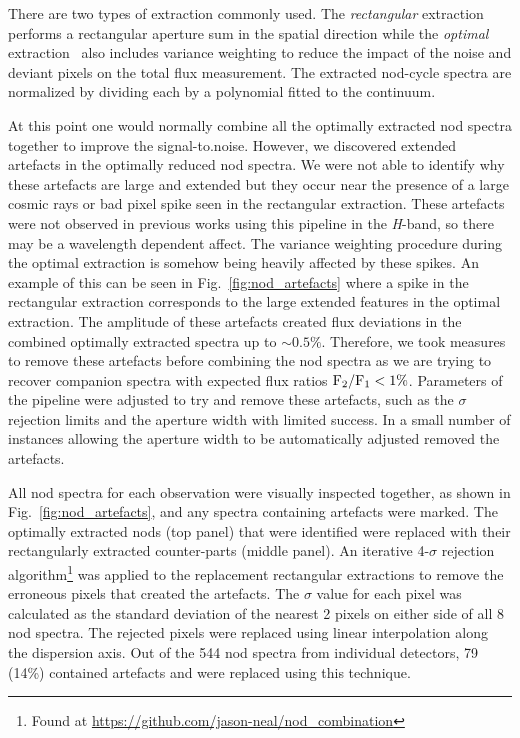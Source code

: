 \documentclass[fleqn,usenatbib]{mnras}
\newcommand*\rd{\color{red}}
\begin{document}
There are two types of extraction commonly used. The \emph{rectangular} extraction performs a rectangular aperture sum in the spatial direction while the \emph{optimal} extraction~\citep{horne_optimal_1986} also includes variance weighting to reduce the impact of the noise and deviant pixels on the total flux measurement. The extracted nod-cycle spectra are normalized by dividing each by a polynomial fitted to the continuum.

At this point one would normally combine all the optimally extracted nod spectra together to improve the signal-to.noise. {\rd However, we discovered extended artefacts in the optimally reduced nod spectra. We were not able to identify why these artefacts are large and extended but they occur near the presence of a large cosmic rays or bad pixel spike seen in the rectangular extraction. These artefacts were not observed in previous works using this pipeline in the \textit{H}-band, so there may be a wavelength dependent affect. The variance weighting procedure during the optimal extraction is somehow being heavily affected by these spikes.} An example of this can be seen in Fig.~\ref{fig:nod_artefacts} where a spike in the rectangular extraction corresponds to the large extended features in the optimal extraction. The amplitude of these artefacts created flux deviations in the combined optimally extracted spectra up to \(\sim 0.5\% \). 
Therefore, we took measures to remove these artefacts before combining the nod spectra as we are trying to recover companion spectra with expected flux ratios \(\rm {F_2}/{F_1} < 1\% \). {\rd Parameters of the pipeline were adjusted to try and remove these artefacts, such as the $\sigma$ rejection limits and the aperture width with limited success. In a small number of instances allowing the aperture width to be automatically adjusted removed the artefacts.} 

All nod spectra for each observation were visually inspected together, as shown in  Fig.~\ref{fig:nod_artefacts}, and any spectra containing artefacts were marked. The optimally extracted nods (top panel)  that were identified were replaced with their rectangularly extracted counter-parts (middle panel). An iterative 4-\(\sigma \) rejection algorithm\footnote{Found at \url{https://github.com/jason-neal/nod_combination}} was applied to the replacement rectangular extractions to remove the erroneous pixels that created the artefacts. The \(\sigma\) value for each pixel was calculated as the standard deviation of the nearest 2 pixels on either side of all 8 nod spectra. The rejected pixels were replaced using linear interpolation along the dispersion axis. {\rd Out of the 544 nod spectra from individual detectors, 79 (14\%) contained artefacts and were replaced using this technique.}
\end{document}
